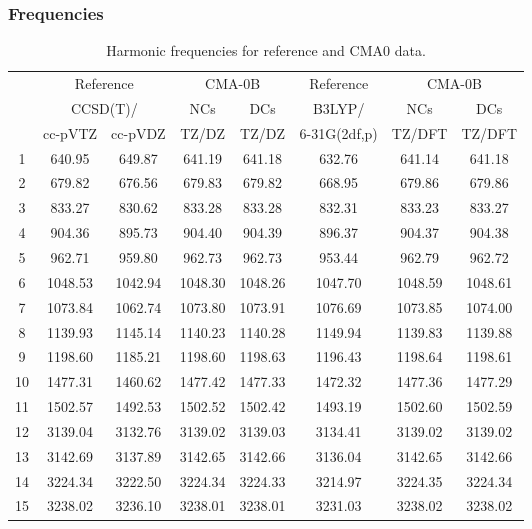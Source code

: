 \documentclass[10pt,oneside]{article}
\begin{document}
\subsubsection*{Frequencies}
\begin{table}[h!]
\centering
\caption{Harmonic frequencies for reference and CMA0 data.}
\begin{tabular}{cccccccc}
\toprule
{} & \multicolumn{2}{c}{Reference} & \multicolumn{2}{c}{CMA-0B} &    Reference & \multicolumn{2}{c}{CMA-0B} \\
{} & \multicolumn{2}{c}{CCSD(T)/} &     NCs &     DCs &       B3LYP/ &     NCs &     DCs \\
{} &   cc-pVTZ & cc-pVDZ &   TZ/DZ &   TZ/DZ & 6-31G(2df,p) &  TZ/DFT &  TZ/DFT \\
\midrule
1  &    640.95 &  649.87 &  641.19 &  641.18 &       632.76 &  641.14 &  641.18 \\
2  &    679.82 &  676.56 &  679.83 &  679.82 &       668.95 &  679.86 &  679.86 \\
3  &    833.27 &  830.62 &  833.28 &  833.28 &       832.31 &  833.23 &  833.27 \\
4  &    904.36 &  895.73 &  904.40 &  904.39 &       896.37 &  904.37 &  904.38 \\
5  &    962.71 &  959.80 &  962.73 &  962.73 &       953.44 &  962.79 &  962.72 \\
6  &   1048.53 & 1042.94 & 1048.30 & 1048.26 &      1047.70 & 1048.59 & 1048.61 \\
7  &   1073.84 & 1062.74 & 1073.80 & 1073.91 &      1076.69 & 1073.85 & 1074.00 \\
8  &   1139.93 & 1145.14 & 1140.23 & 1140.28 &      1149.94 & 1139.83 & 1139.88 \\
9  &   1198.60 & 1185.21 & 1198.60 & 1198.63 &      1196.43 & 1198.64 & 1198.61 \\
10 &   1477.31 & 1460.62 & 1477.42 & 1477.33 &      1472.32 & 1477.36 & 1477.29 \\
11 &   1502.57 & 1492.53 & 1502.52 & 1502.42 &      1493.19 & 1502.60 & 1502.59 \\
12 &   3139.04 & 3132.76 & 3139.02 & 3139.03 &      3134.41 & 3139.02 & 3139.02 \\
13 &   3142.69 & 3137.89 & 3142.65 & 3142.66 &      3136.04 & 3142.65 & 3142.66 \\
14 &   3224.34 & 3222.50 & 3224.34 & 3224.33 &      3214.97 & 3224.35 & 3224.34 \\
15 &   3238.02 & 3236.10 & 3238.01 & 3238.01 &      3231.03 & 3238.02 & 3238.02 \\
\bottomrule
\end{tabular}
\end{table}
\end{document}
